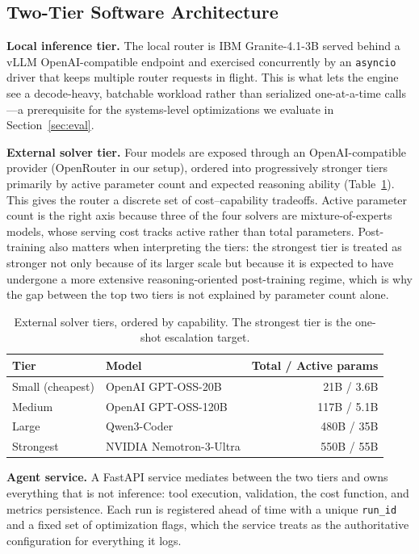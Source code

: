 \documentclass[10pt]{article}
\begin{document}
\subsection{Two-Tier Software Architecture}
\label{sec:sysarch}
\textbf{Local inference tier.}
The local router is IBM Granite-4.1-3B served behind a vLLM OpenAI-compatible endpoint
and exercised concurrently by an \texttt{asyncio} driver that keeps multiple router
requests in flight. This is what lets the engine see a decode-heavy, batchable
workload rather than serialized one-at-a-time calls---a prerequisite for the
systems-level optimizations we evaluate in Section~\ref{sec:eval}.

\textbf{External solver tier.}
Four models are exposed through an OpenAI-compatible provider (OpenRouter in our
setup), ordered into progressively stronger tiers primarily by active parameter count
and expected reasoning ability (Table~\ref{tab:solvers}). This gives the router a
discrete set of cost--capability tradeoffs. Active parameter count is the right axis
because three of the four solvers are mixture-of-experts models, whose serving cost
tracks active rather than total parameters. Post-training also matters when
interpreting the tiers: the strongest tier is treated as stronger not only because of
its larger scale but because it is expected to have undergone a more extensive
reasoning-oriented post-training regime, which is why the gap between the top two
tiers is not explained by parameter count alone.

\begin{table}[ht]
\centering
\small
\begin{tabular}{@{}llr@{}}
\toprule
\textbf{Tier} & \textbf{Model} & \textbf{Total / Active params} \\
\midrule
Small (cheapest) & OpenAI GPT-OSS-20B   & 21B / 3.6B \\
Medium           & OpenAI GPT-OSS-120B  & 117B / 5.1B \\
Large            & Qwen3-Coder          & 480B / 35B \\
Strongest        & NVIDIA Nemotron-3-Ultra & 550B / 55B \\
\bottomrule
\end{tabular}
\caption{External solver tiers, ordered by capability. The strongest tier is the
one-shot escalation target.}
\label{tab:solvers}
\end{table}

\textbf{Agent service.}
A FastAPI service mediates between the two tiers and owns everything that is not
inference: tool execution, validation, the cost function, and metrics persistence.
Each run is registered ahead of time with a unique \texttt{run\_id} and a fixed set of
optimization flags, which the service treats as the authoritative configuration for
everything it logs.
\end{document}
